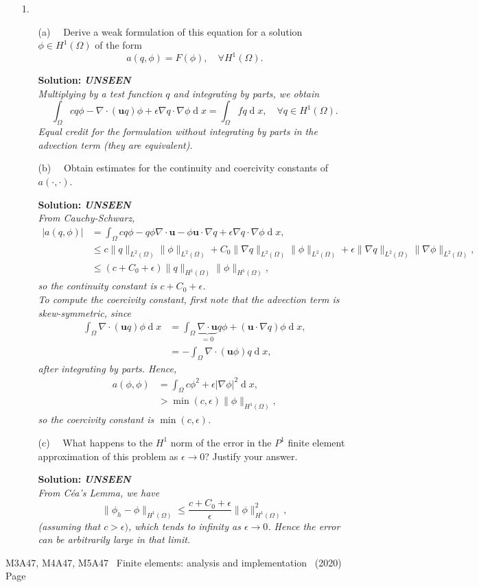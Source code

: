 \documentclass[12pt]{article}
\newcommand{\coursenum}{M3A47, M4A47, M5A47} %
\newcommand{\coursename}{Finite elements: analysis and implementation} %
\newcommand{\unseen}{{\bfseries UNSEEN\\}}
\newcommand{\exammarks}[1]{\begin{flushright}[#1 marks]\end{flushright}}%
\def\MM#1{\boldsymbol{#1}}
\DeclareMathOperator{\diff}{d}
\newcommand{\soln}[1]{{\bfseries Solution:} {\itshape \color{blue} #1}}
\newcommand{\soln}[1]{}
\newcommand{\examyear}{2020}
\newenvironment{Question}[1] 
 {\begin{itemize} \item[\large #1.~~]}{\end{itemize} \medskip}
\newcommand{\EndPage}{
	\vfill \coursenum ~ \coursename ~
	(\examyear) \hfill Page \thepage \newpage
	}
\newcommand{\BeginParts}{\begin{itemize}}
\newcommand{\Part}[1]{\item [(#1)~~]}
\newcommand{\EndParts}{\end{itemize}}
\begin{document}
\begin{Question}{1}
\BeginParts
\Part{a} Derive a weak formulation of this equation for a solution
$\phi\in H^1(\Omega)$ of the form
\begin{equation}
  a(q,\phi) = F(\phi), \quad \forall H^1(\Omega).
\end{equation}
\exammarks{5}
\soln{\unseen
  Multiplying by a test function $q$ and integrating by parts, we obtain
  \[
  \int_{\Omega} cq\phi -\nabla\cdot (\MM{u}q)\phi + \epsilon \nabla q\cdot\nabla\phi
  \diff x = \int_{\Omega} fq\diff x, \quad \forall q\in H^1(\Omega).
  \]
  Equal credit for the formulation without integrating by parts in the
  advection term (they are equivalent).
}
\Part{b} Obtain estimates for the continuity and coercivity constants
of $a(\cdot,\cdot)$.
\exammarks{10}
\soln{\unseen
  From Cauchy-Schwarz, 
  \begin{align*}
    |a(q,\phi)| & = \int_{\Omega} cq\phi -q\phi\nabla\cdot\MM{u} - \phi\MM{u}\cdot
    \nabla q + \epsilon \nabla q \cdot \nabla \phi \diff x, \\
    & \leq c\|q\|_{L^2(\Omega)}\|\phi\|_{L^2(\Omega)}
    + C_0\|\nabla q\|_{L^2(\Omega)}\|\phi\|_{L^2(\Omega)}
    + \epsilon \|\nabla q \|_{L^2(\Omega)}\|\nabla \phi\|_{L^2(\Omega)}, \\
    & \leq \left(c + C_0 + \epsilon\right)\|q\|_{H^1(\Omega)}
    \|\phi\|_{H^1(\Omega)}, 
  \end{align*}
  so the continuity constant is $c + C_0  + \epsilon$.\\
  To compute the coercivity constant, first note that the advection term
  is skew-symmetric, since
  \begin{align*}
    \int_{\Omega} \nabla\cdot (\MM{u}q)\phi \diff x & =
    \int_{\Omega} \underbrace{\nabla\cdot \MM{u}}_{=0} q\phi
    + (\MM{u}\cdot\nabla q) \phi\diff x, \\
    & = -\int_{\Omega} \nabla\cdot(\MM{u}\phi) q \diff x,
  \end{align*}
  after integrating by parts. Hence,
  \begin{align*}
    a(\phi,\phi) & = \int_{\Omega} c\phi^2 + \epsilon|\nabla \phi|^2
    \diff x, \\
    & > \min(c,\epsilon) \|\phi\|_{H^1(\Omega)},
  \end{align*}
  so the coercivity constant is $\min(c,\epsilon)$.
}
\Part{c} What happens to the $H^1$ norm of the error in the $P^1$ finite element approximation
of this problem as $\epsilon \to 0$? Justify your answer.
\exammarks{5}
\soln{\unseen From C\'ea's Lemma, we have
  \[
  \|\phi_h - \phi\|_{H^1(\Omega)} \leq
  \frac{c + C_0+\epsilon}{\epsilon}
  \|\phi\|^2_{H^1(\Omega)},
  \]
  (assuming that $c>\epsilon)$, which tends to infinity as $\epsilon
  \to 0$. Hence the error can be arbitrarily large in that limit.}
\EndParts
\end{Question}
\EndPage
\end{document}

